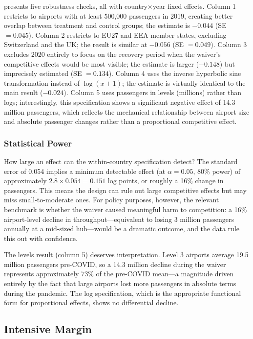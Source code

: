 \documentclass[12pt]{article}
\begin{document}
 presents five robustness checks, all with country$\times$year fixed effects. Column 1 restricts to airports with at least 500,000 passengers in 2019, creating better overlap between treatment and control groups; the estimate is $-0.044$ (SE $= 0.045$). Column 2 restricts to EU27 and EEA member states, excluding Switzerland and the UK; the result is similar at $-0.056$ (SE $= 0.049$). Column 3 excludes 2020 entirely to focus on the recovery period when the waiver's competitive effects would be most visible; the estimate is larger ($-0.148$) but imprecisely estimated (SE $= 0.134$). Column 4 uses the inverse hyperbolic sine transformation instead of $\log(x+1)$; the estimate is virtually identical to the main result ($-0.024$). Column 5 uses passengers in levels (millions) rather than logs; interestingly, this specification shows a significant negative effect of 14.3 million passengers, which reflects the mechanical relationship between airport size and absolute passenger changes rather than a proportional competitive effect.

\subsubsection*{Statistical Power} How large an effect can the within-country specification detect? The standard error of 0.054 implies a minimum detectable effect (at $\alpha = 0.05$, 80\% power) of approximately $2.8 \times 0.054 = 0.151$ log points, or roughly a 16\% change in passengers. This means the design can rule out large competitive effects but may miss small-to-moderate ones. For policy purposes, however, the relevant benchmark is whether the waiver caused meaningful harm to competition: a 16\% airport-level decline in throughput---equivalent to losing 3 million passengers annually at a mid-sized hub---would be a dramatic outcome, and the data rule this out with confidence.

The levels result (column 5) deserves interpretation. Level 3 airports average 19.5 million passengers pre-COVID, so a 14.3 million decline during the waiver represents approximately 73\% of the pre-COVID mean---a magnitude driven entirely by the fact that large airports lost more passengers in absolute terms during the pandemic. The log specification, which is the appropriate functional form for proportional effects, shows no differential decline.

\subsection{Intensive Margin}
\end{document}
